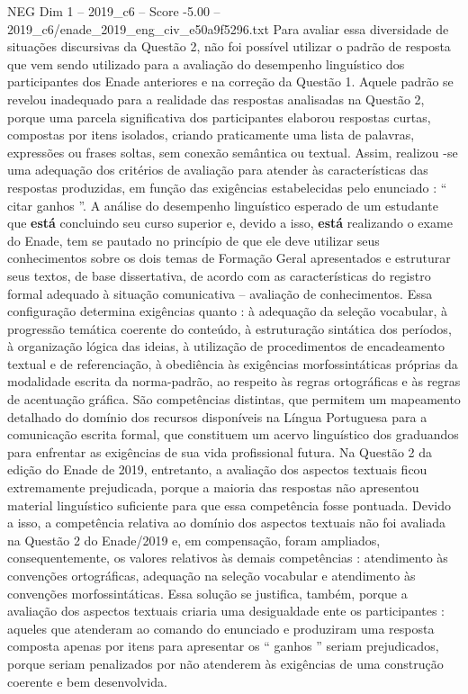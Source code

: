 \begin{textsample}{NEG Dim 1 – 2019\_c6 – Score -5.00 – 2019\_c6/enade\_2019\_eng\_civ\_e50a9f5296.txt}
Para avaliar essa diversidade de situações discursivas da Questão 2, não foi possível utilizar o padrão de resposta que vem sendo utilizado para a avaliação do desempenho linguístico dos participantes dos Enade anteriores e na correção da Questão 1.
Aquele padrão se revelou inadequado para a realidade das respostas analisadas na Questão 2, porque uma parcela significativa dos participantes elaborou respostas curtas, compostas por itens isolados, criando praticamente uma lista de palavras, expressões ou frases soltas, sem conexão semântica ou textual.
Assim, realizou -se uma adequação dos critérios de avaliação para atender às características das respostas produzidas, em função das exigências estabelecidas pelo enunciado : “ citar ganhos ”.
A análise do desempenho linguístico esperado de um estudante que \textbf{está} concluindo seu curso superior e, devido a isso, \textbf{está} realizando o exame do Enade, tem se pautado no princípio de que ele deve utilizar seus conhecimentos sobre os dois temas de Formação Geral apresentados e estruturar seus textos, de base dissertativa, de acordo com as características do registro formal adequado à situação comunicativa – avaliação de conhecimentos.
Essa configuração determina exigências quanto : à adequação da seleção vocabular, à progressão temática coerente do conteúdo, à estruturação sintática dos períodos, à organização lógica das ideias, à utilização de procedimentos de encadeamento textual e de referenciação, à obediência às exigências morfossintáticas próprias da modalidade escrita da norma-padrão, ao respeito às regras ortográficas e às regras de acentuação gráfica.
São competências distintas, que permitem um mapeamento detalhado do domínio dos recursos disponíveis na Língua Portuguesa para a comunicação escrita formal, que constituem um acervo linguístico dos graduandos para enfrentar as exigências de sua vida profissional futura.
Na Questão 2 da edição do Enade de 2019, entretanto, a avaliação dos aspectos textuais ficou extremamente prejudicada, porque a maioria das respostas não apresentou material linguístico suficiente para que essa competência fosse pontuada.
Devido a isso, a competência relativa ao domínio dos aspectos textuais não foi avaliada na Questão 2 do Enade/2019 e, em compensação, foram ampliados, consequentemente, os valores relativos às demais competências : atendimento às convenções ortográficas, adequação na seleção vocabular e atendimento às convenções morfossintáticas.
Essa solução se justifica, também, porque a avaliação dos aspectos textuais criaria uma desigualdade ente os participantes : aqueles que atenderam ao comando do enunciado e produziram uma resposta composta apenas por itens para apresentar os “ ganhos ” seriam prejudicados, porque seriam penalizados por não atenderem às exigências de uma construção coerente e bem desenvolvida.

\end{textsample}
